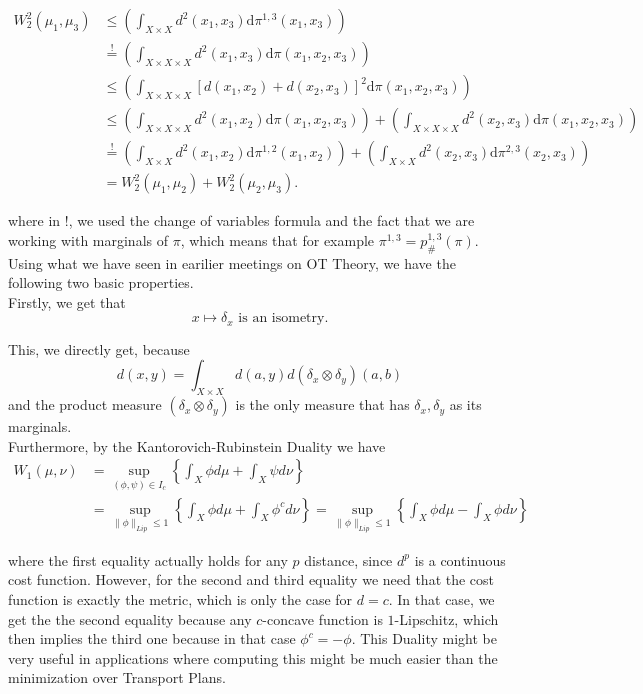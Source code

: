 \documentclass[15pt]{article}
\begin{document}
\begin{align*}W_2^2(\mu_1,\mu_3)
  &\leq\left(\int_{X\times X}d^2(x_1,x_3)\mathrm{d}\pi^{1,3}(x_1,x_3)\right)
  \\&\overset{!}{=}\left(\int_{X\times X\times X}d^2(x_1,x_3)\mathrm{d}\pi(x_1,x_2,x_3)\right)
  \\&\leq \left(\int_{ X\times X\times X}\left[d(x_1,x_2)+d(x_2,x_3)\right]^2\mathrm{d}\pi(x_1,x_2,x_3)\right)
  \\&\leq\left(\int_{X\times X \times X}d^2(x_1,x_2)\mathrm{d}\pi(x_1,x_2,x_3)\right)+\left(\int_{X\times X\times X}d^2(x_2,x_3)\mathrm{d}\pi(x_1,x_2,x_3)\right)
  \\&\overset{!}{=}\left(\int_{X\times X}d^2(x_1,x_2)\mathrm{d}\pi^{1,2}(x_1,x_2)\right)+\left(\int_{X\times X}d^2(x_2,x_3)\mathrm{d}\pi^{2,3}(x_2,x_3)\right)
  \\&=W^2_2(\mu_1,\mu_2)+W_2^2(\mu_2,\mu_3).
\end{align*}

where in !, we used the change of variables formula and the fact that we are working with marginals of $\pi$, which means that for example $\pi^{1,3} = p^{1,3}_{\#}(\pi)$. \\


Using what we have seen in earilier meetings on OT Theory, we have the following two basic properties. \\
Firstly, we get that $$x \mapsto \delta_x \text{ is an isometry.}$$ 

This, we directly get, because $$d(x,y) = \int_{X \times X} d(a,y) d(\delta_x \otimes \delta_y)(a,b)$$ and the product measure $(\delta_x \otimes \delta_y)$ is the only measure that has $\delta_x,\delta_y$ as its marginals. \\

Furthermore, by the Kantorovich-Rubinstein Duality we have \begin{align*} W_1(\mu,\nu) &= \sup_{(\phi,\psi) \in I_c} \left\{ \int_X \phi d\mu + \int_X \psi d\nu \right\} \\ &= \sup_{\|\phi\|_{Lip} \leq 1} \left\{\int_X \phi d\mu + \int_X \phi^c d\nu  \right\} 
   = \sup_{\|\phi\|_{Lip} \leq 1} \left\{\int_X \phi d\mu - \int_X \phi d\nu  \right\} \end{align*}

where the first equality actually holds for any $p$ distance, since $d^p$ is a continuous cost function. 
However, for the second and third equality we need that the cost function is exactly the metric, which is only the case for $d = c$. 
In that case, we get the the second equality because any $c$-concave function is $1$-Lipschitz, which then implies the third one because in that case $\phi^c = -\phi$.
This Duality might be very useful in applications where computing this might be much easier than the minimization over Transport Plans. 
\end{document}
